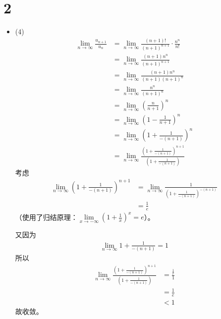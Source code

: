 \documentclass{article}
\begin{document}
\section*{2}

\begin{itemize}
  \item (4)
        \begin{align*}
          \lim\limits_{n \to \infty} \frac{u_{n + 1}}{u_n}
           & = \lim\limits_{n \to \infty} \frac{(n +1)!}{(n+1)^{n + 1}} \cdot \frac{n^n}{n!}                                    \\
           & = \lim\limits_{n \to \infty} \frac{(n +1) n^n}{(n+1)^{n + 1}}                                                      \\
           & = \lim\limits_{n \to \infty} \frac{(n +1) n^n}{(n +1)(n+1)^{n}}                                                    \\
           & = \lim\limits_{n \to \infty} \frac{n^n}{(n+1)^{n}}                                                                 \\
           & = \lim\limits_{n \to \infty} \left(\frac{n}{n+1}\right)^n                                                          \\
           & = \lim\limits_{n \to \infty} \left(1 - \frac{1}{n + 1}\right)^n                                                    \\
           & = \lim\limits_{n \to \infty} \left(1 + \frac{1}{-(n + 1)}\right)^n                                                 \\
           & = \lim\limits_{n \to \infty} \frac{\left(1 + \frac{1}{-(n + 1)}\right)^{n+1}}{\left(1 + \frac{1}{-(n + 1)}\right)}
        \end{align*}
        考虑
        \begin{align*}
          \lim\limits_{n \to \infty} \left(1 + \frac{1}{-(n + 1)}\right)^{n+1}
           & = \lim\limits_{n \to \infty} \frac{1}{\left(1 + \frac{1}{-(n + 1)}\right)^{-(n+1)}} \\
           & = \frac{1}{e}
        \end{align*}
        （使用了归结原理：$\lim\limits_{x \to -\infty} (1 + \frac{1}{x})^x = e$）。

        又因为
        \begin{align*}
          \lim\limits_{n \to \infty} 1 + \frac{1}{-(n + 1)} = 1
        \end{align*}
        所以
        \begin{align*}
          \lim\limits_{n \to \infty} \frac{\left(1 + \frac{1}{-(n + 1)}\right)^{n+1}}{\left(1 + \frac{1}{-(n + 1)}\right)}
           & = \frac{\frac{1}{e}}{1} \\
           & = \frac{1}{e} \\
           & < 1
        \end{align*}
        故收敛。
\end{itemize}
\end{document}
